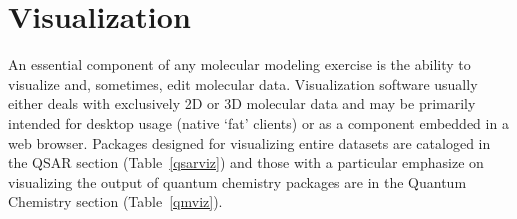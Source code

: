 \section{Visualization}
  
An essential component of any molecular modeling exercise is the ability to visualize and, sometimes, edit molecular data.  Visualization software usually either deals with exclusively 2D or 3D molecular data and may be primarily intended for desktop usage (native `fat' clients) or as a component embedded in a web browser.  Packages designed for visualizing entire datasets are cataloged in the QSAR section (Table~\ref{qsarviz}) and those with a particular emphasize on visualizing the output of quantum chemistry packages are in the Quantum Chemistry section (Table~\ref{qmviz}).